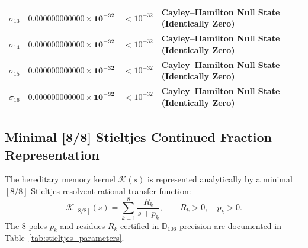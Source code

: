 \documentclass[11pt,a4paper,reqno]{article}
\theoremstyle{plain}
\theoremstyle{definition}
\theoremstyle{remark}
\numberwithin{equation}{section}
\newcommand{\Ddd}{\mathbb{D}_{106}}
\begin{document}
\begin{table}[htbp]
\begin{tabularx}{\textwidth}{@{}C{1.2cm} C{3.8cm} C{2.6cm} Y@{}}
$\sigma_{13}$ & $\mathbf{0.000000000000 \times 10^{-32}}$ & $< 10^{-32}$ & \textbf{Cayley--Hamilton Null State (Identically Zero)} \\
$\sigma_{14}$ & $\mathbf{0.000000000000 \times 10^{-32}}$ & $< 10^{-32}$ & \textbf{Cayley--Hamilton Null State (Identically Zero)} \\
$\sigma_{15}$ & $\mathbf{0.000000000000 \times 10^{-32}}$ & $< 10^{-32}$ & \textbf{Cayley--Hamilton Null State (Identically Zero)} \\
$\sigma_{16}$ & $\mathbf{0.000000000000 \times 10^{-32}}$ & $< 10^{-32}$ & \textbf{Cayley--Hamilton Null State (Identically Zero)} \\
\bottomrule
\end{tabularx}
\end{table}

\subsection{Minimal [8/8] Stieltjes Continued Fraction Representation}
\label{subsec:stieltjes_resolvent_rep}
The hereditary memory kernel $\mathcal{K}(s)$ is represented analytically by a minimal $[8/8]$ Stieltjes resolvent rational transfer function:
\begin{equation}
  \mathcal{K}_{[8/8]}(s) = \sum_{k=1}^8 \frac{R_k}{s + p_k}, \qquad R_k > 0, \quad p_k > 0.
  \label{eq:stieltjes_resolvent}
\end{equation}
The 8 poles $p_k$ and residues $R_k$ certified in $\Ddd$ precision are documented in Table~\ref{tab:stieltjes_parameters}.
\end{document}
